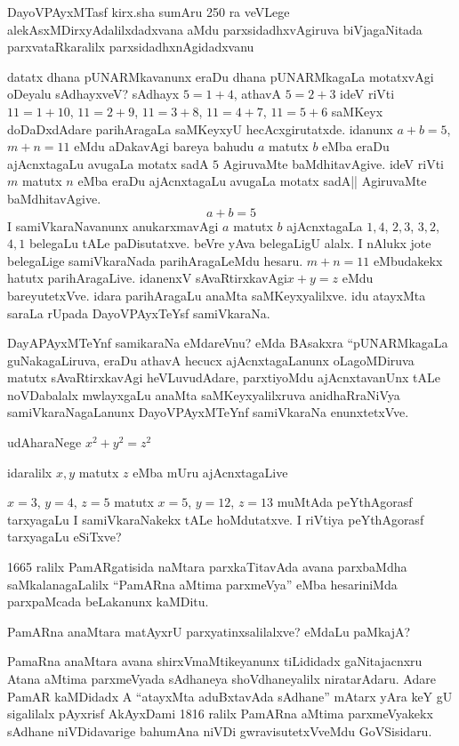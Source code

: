 DayoVPAyxMTasf kirx.sha sumAru {\rm 250} ra veVLege alekAsxMDirxyAdalilxdadxvana aMdu parxsidadhxvAgiruva biVjagaNitada parxvataRkaralilx parxsidadhxnAgidadxvanu

datatx dhana pUNARMkavanunx eraDu dhana pUNARMkagaLa motatxvAgi oDeyalu sAdhayxveV? sAdhayx \quad $5=1+4$, \quad athavA \quad $5=2+3$ \quad ideV riVti \quad $11=1+10$, \quad $11=2+9$, \quad $11=3+8$, \quad $11=4+7$, \quad $11=5+6$ \quad saMKeyx doDaDxdAdare parihAragaLa saMKeyxyU hecAcxgirutatxde. idanunx \quad $a+b=5$, \quad $m+n=11$ \quad eMdu aDakavAgi bareya bahudu \quad $a$ \quad matutx \quad $b$ \quad eMba eraDu ajAcnxtagaLu avugaLa motatx sadA $5$ AgiruvaMte baMdhitavAgive. ideV riVti \quad $m$ \quad matutx \quad $n$ \quad eMba eraDu ajAcnxtagaLu avugaLa motatx sadA|| AgiruvaMte baMdhitavAgive.
$$
a+b=5
$$
I samiVkaraNavanunx anukarxmavAgi $a$ matutx $b$ ajAcnxtagaLa \quad $1, 4$, \quad $2, 3$, \quad $3, 2$, $4, 1$ \quad belegaLu tALe paDisutatxve. beVre yAva belegaLigU alalx. I nAlukx jote belegaLige samiVkaraNada parihAragaLeMdu hesaru. \quad $m+n=11$ \quad eMbudakekx hatutx parihAragaLive. idanenxV sAvaRtirxkavAgi\quad  $x+y=z$ \quad eMdu bareyutetxVve. idara parihAragaLu anaMta saMKeyxyalilxve. idu atayxMta saraLa rUpada DayoVPAyxTeYsf samiVkaraNa.

DayAPAyxMTeYnf samikaraNa eMdareVnu? eMda BAsakxra ``pUNARMkagaLa guNaka\-gaLiruva, eraDu athavA hecucx ajAcnxtagaLanunx oLagoMDiruva matutx sAvaRtirxkavAgi heVLuvudAdare, parxtiyoMdu ajAcnxtavanUnx tALe noVDabalalx mwlayxgaLu anaMta saMKeyxyalilxruva anidhaRraNiVya samiVkaraNagaLanunx DayoVPAyxMTeYnf samiVkaraNa enunxtetxVve.

udAharaNege \quad $x^2+y^2=z^2$

idaralilx $x, y$ matutx $z$ eMba mUru ajAcnxtagaLive 

$x=3$, \quad $y=4$, \quad $z=5$ \quad matutx \quad $x=5$, \quad $y=12$, \quad $z=13$ \quad muMtAda peYthAgorasf tarxyagaLu I samiVkaraNakekx tALe hoMdutatxve. I riVtiya peYthAgorasf tarxyagaLu eSiTxve? 

{\rm 1665} ralilx PamARgatisida naMtara parxkaTitavAda avana parxbaMdha saMkalanagaLalilx ``PamARna aMtima parxmeVya'' eMba hesariniMda parxpaMcada beLakanunx kaMDitu.

PamARna anaMtara matAyxrU parxyatinxsalilalxve? eMdaLu paMkajA?

PamaRna anaMtara avana shirxVmaMtikeyanunx tiLididadx gaNitajacnxru Atana aMtima parxmeVyada sAdhaneya shoVdhaneyalilx niratarAdaru. Adare PamAR kaMDidadx A ``atayxMta aduBxtavAda sAdhane'' mAtarx yAra keY gU sigalilalx pAyxrisf AkAyxDami {\rm 1816} ralilx PamARna aMtima parxmeVyakekx sAdhane niVDidavarige bahumAna niVDi gwravisutetxVveMdu  GoVSisidaru.

